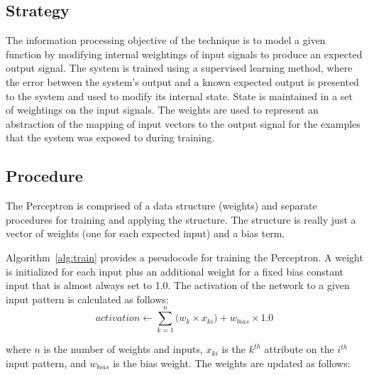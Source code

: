 \subsection{Strategy}
The information processing objective of the technique is to model a given function by modifying internal weightings of input signals to produce an expected output signal.
The system is trained using a supervised learning method, where the error between the system's output and a known expected output is presented to the system and used to modify its internal state. State is maintained in a set of weightings on the input signals. The weights are used to represent an abstraction of the mapping of input vectors to the output signal for the examples that the system was exposed to during training.

\subsection{Procedure}
The Perceptron is comprised of a data structure (weights) and separate procedures for training and applying the structure. The structure is really just a vector of weights (one for each expected input) and a bias term.

Algorithm~\ref{alg:train} provides a pseudocode for training the Perceptron. A weight is initialized for each input plus an additional weight for a fixed bias constant input that is almost always set to 1.0. The activation of the network to a given input pattern is calculated as follows:
\begin{equation}
	activation \leftarrow \sum_{k=1}^{n}\big( w_{k} \times x_{ki}\big) + w_{bias} \times 1.0
\end{equation}

where $n$ is the number of weights and inputs, $x_{ki}$ is the $k^{th}$ attribute on the $i^{th}$ input pattern, and $w_{bias}$ is the bias weight. The weights are updated as follows:

